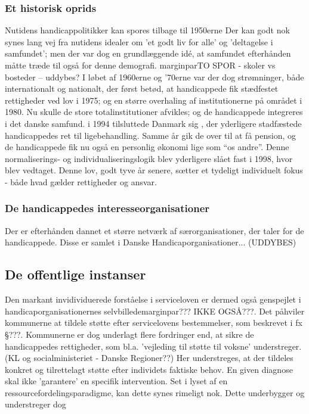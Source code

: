 \subsubsection{Et historisk oprids}
Nutidens handicappolitikker kan spores tilbage til 1950erne
Der kan godt nok synes lang vej fra nutidens idealer om 'et godt liv for alle' og 'deltagelse i samfundet'; men der var dog en grundlæggende idé, at samfundet efterhånden måtte træde til også for denne demografi.
marginpar{TO SPOR - skoler vs bosteder -- uddybes?}
I løbet af 1960erne og '70erne var der dog strømninger, både internationalt og nationalt, der først betød, at handicappede fik stædfestet rettigheder ved lov i 1975; og en større overhaling af institutionerne på området i 1980.
Nu skulle de store totalinstitutioner afvikles; og de handicappede integreres i det danske samfund. 
i 1994 tilsluttede Danmark sig , der yderligere stadfæstede handicappedes ret til ligebehandling. Samme år gik de over til at få pension, og de handicappede fik nu også en personlig økonomi lige som “os andre”.
Denne normaliserings- og individualiseringslogik blev yderligere slået fast i 1998, hvor  blev vedtaget.
Denne lov, godt tyve år senere, sœtter et tydeligt individuelt fokus - både hvad gælder rettigheder og ansvar.

\subsubsection{De handicappedes interesseorganisationer}
Der er efterhånden dannet et større netværk af særorganisationer, der taler for de handicappede.
Disse er samlet i Danske Handicaporganisationer... (UDDYBES)

\subsection{De offentlige instanser}
Den markant invidividuerede forståelse i serviceloven er dermed også genspejlet i handicaporganisationernes selvbilledemarginpar{??? IKKE OGSÅ???}.
Det påhviler kommunerne at tildele støtte efter servicelovens bestemmelser, som beskrevet i fx §???.
Kommunerne er dog underlagt flere fordringer end, at sikre de handicappedes rettigheder, som bl.a. 'vejleding til støtte til voksne' understreger. (KL og socialministeriet - Danske Regioner??)
Her understreges, at der tildeles konkret og tilrettelagt støtte efter individets faktiske behov.
En given diagnose skal ikke 'garantere' en specifik intervention.
Set i lyset af en ressourcefordelingsparadigme, kan dette synes rimeligt nok. Dette underbygger og understreger dog 

